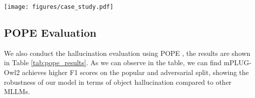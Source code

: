 \documentclass[10pt,twocolumn,letterpaper]{article}
\newcommand{\modelname}{mPLUG-Owl2\xspace}
\begin{document}
\begin{figure*}[htp]
    \centering
    \texttt{[image: figures/case\_study.pdf]}
    \caption{Example cases compared with InstructBLIP~\cite{Dai2023InstructBLIP}, LLAVA~\cite{Liu2023Llava}, LLAVA-1.5~\cite{Liu2023LLava15}, MiniGPT-4~\cite{Zhu2023MiniGPT4} and our~\modelname.}
    \label{fig:case}
\end{figure*}


\subsection{POPE Evaluation}
We also conduct the hallucination evaluation using POPE \cite{Li2023pope}, the results are shown in Table \ref{tab:pope_results}. As we can observe in the table, we can find \modelname achieves higher F1 scores on the popular and adversarial split, showing the robustness of our model in terms of object hallucination compared to other MLLMs.
\end{document}
